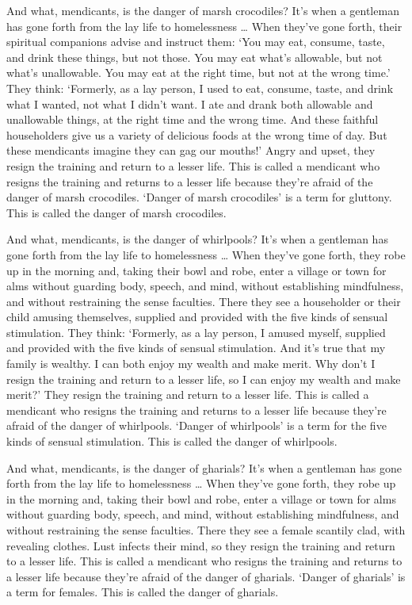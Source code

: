 \documentclass[12pt,openany]{book}%
\begin{document}
And what, mendicants, is the danger of marsh crocodiles? It’s when a gentleman has gone forth from the lay life to homelessness … When they’ve gone forth, their spiritual companions advise and instruct them: ‘You may eat, consume, taste, and drink these things, but not those. You may eat what’s allowable, but not what’s unallowable. You may eat at the right time, but not at the wrong time.’ They think: ‘Formerly, as a lay person, I used to eat, consume, taste, and drink what I wanted, not what I didn’t want. I ate and drank both allowable and unallowable things, at the right time and the wrong time. And these faithful householders give us a variety of delicious foods at the wrong time of day. But these mendicants imagine they can gag our mouths!’ Angry and upset, they resign the training and return to a lesser life. This is called a mendicant who resigns the training and returns to a lesser life because they’re afraid of the danger of marsh crocodiles. ‘Danger of marsh crocodiles’ is a term for gluttony. This is called the danger of marsh crocodiles. 

And what, mendicants, is the danger of whirlpools? It’s when a gentleman has gone forth from the lay life to homelessness … When they’ve gone forth, they robe up in the morning and, taking their bowl and robe, enter a village or town for alms without guarding body, speech, and mind, without establishing mindfulness, and without restraining the sense faculties. There they see a householder or their child amusing themselves, supplied and provided with the five kinds of sensual stimulation. They think: ‘Formerly, as a lay person, I amused myself, supplied and provided with the five kinds of sensual stimulation. And it’s true that my family is wealthy. I can both enjoy my wealth and make merit. Why don’t I resign the training and return to a lesser life, so I can enjoy my wealth and make merit?’ They resign the training and return to a lesser life. This is called a mendicant who resigns the training and returns to a lesser life because they’re afraid of the danger of whirlpools. ‘Danger of whirlpools’ is a term for the five kinds of sensual stimulation. This is called the danger of whirlpools. 

And what, mendicants, is the danger of gharials? It’s when a gentleman has gone forth from the lay life to homelessness … When they’ve gone forth, they robe up in the morning and, taking their bowl and robe, enter a village or town for alms without guarding body, speech, and mind, without establishing mindfulness, and without restraining the sense faculties. There they see a female scantily clad, with revealing clothes. Lust infects their mind, so they resign the training and return to a lesser life. This is called a mendicant who resigns the training and returns to a lesser life because they’re afraid of the danger of gharials. ‘Danger of gharials’ is a term for females. This is called the danger of gharials. 
\end{document}
